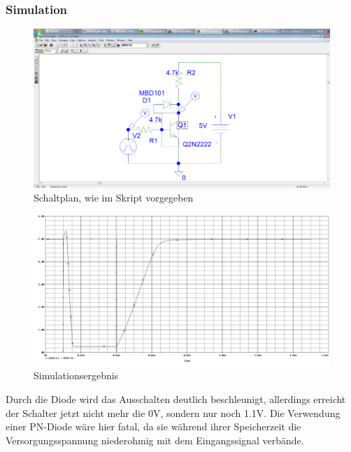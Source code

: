 \subsubsection*{Simulation}
\begin{figure}[H]
	\centering
	\includegraphics[width=\linewidth]{versuch5/spice/s5412.png}
	\caption{Schaltplan, wie im Skript vorgegeben}
\end{figure}
\begin{figure}[H]
	\centering
	\includegraphics[width=\linewidth]{versuch5/spice/5412.png}
	\caption{Simulationsergebnis}
\end{figure}
Durch die Diode wird das Ausschalten deutlich beschleunigt, allerdings erreicht der Schalter jetzt nicht mehr die 0V, sondern nur noch 1.1V. Die Verwendung einer PN-Diode wäre hier fatal, da sie während ihrer Speicherzeit die Versorgungsspannung niederohmig mit dem Eingangssignal verbände.


